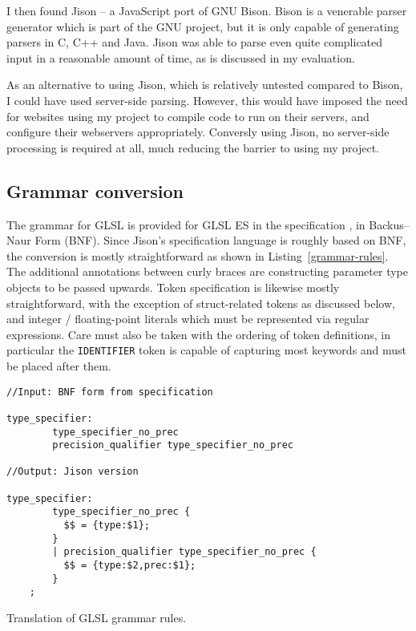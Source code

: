 \documentclass[12pt,twoside,notitlepage]{report}
\begin{document}
I then found Jison \cite{jison} -- a JavaScript port of GNU Bison. Bison is a venerable parser generator which is part of the GNU project, but it is only capable of generating parsers in C, C++ and Java.  Jison was able to parse even quite complicated input in a reasonable amount of time, as is discussed in my evaluation. 

As an alternative to using Jison, which is relatively untested compared to Bison, I could have used server-side parsing. However, this would have imposed the need for websites using my project to compile code to run on their servers, and configure their webservers appropriately. Conversly using Jison, no server-side processing is required at all, much reducing the barrier to using my project.

\subsection{Grammar conversion}
The grammar for GLSL is provided for GLSL ES in the specification \cite{glsl-spec}, in Backus–Naur Form (BNF). Since Jison's specification language is roughly based on BNF, the conversion is mostly straightforward as shown in Listing~\ref{grammar-rules}. The additional annotations between curly braces are constructing parameter type objects to be passed upwards. Token specification is likewise mostly straightforward, with the exception of struct-related tokens as discussed below, and integer / floating-point literals which must be represented via regular expressions. Care must also be taken with the ordering of token definitions, in particular the \texttt{IDENTIFIER} token is capable of capturing most keywords and must be placed after them.
\begin{listing}
\begin{verbatim}
//Input: BNF form from specification

type_specifier:
        type_specifier_no_prec
        precision_qualifier type_specifier_no_prec

//Output: Jison version

type_specifier:
        type_specifier_no_prec { 
          $$ = {type:$1}; 
        }
        | precision_qualifier type_specifier_no_prec { 
          $$ = {type:$2,prec:$1}; 
        }
	;
\end{verbatim}
\caption{Translation of GLSL grammar rules.\label{grammar-rules}}
\end{listing}
\end{document}
